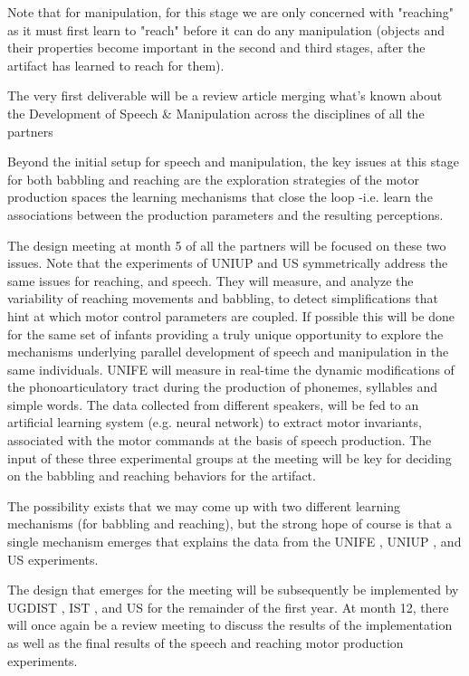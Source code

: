 Note that for manipulation, for this stage we are only concerned with
"reaching" as it must first learn to "reach" before it can do any
manipulation (objects and their properties become important in the
second and third stages, after the artifact has learned to reach for
them).

The very first deliverable will be a review article merging what's
known about the Development of Speech \& Manipulation across the
disciplines of all the partners

Beyond the initial setup for speech and manipulation, the key issues
at this stage for both babbling and reaching are the exploration
strategies of the motor production spaces the learning mechanisms that
close the loop -i.e. learn the associations between the production
parameters and the resulting perceptions.

The design meeting at month 5 of all the partners will be focused on
these two issues. Note that the experiments of UNIUP and US
symmetrically address the same issues for reaching, and speech. They
will measure, and analyze the variability of reaching movements and
babbling, to detect simplifications that hint at which motor control
parameters are coupled. If possible this will be done for the same set
of infants providing a truly unique opportunity to explore the
mechanisms underlying parallel development of speech and manipulation
in the same individuals. UNIFE will measure in real-time the dynamic
modifications of the phonoarticulatory tract during the production of
phonemes, syllables and simple words. The data collected from
different speakers, will be fed to an artificial learning system
(e.g. neural network) to extract motor invariants, associated with the
motor commands at the basis of speech production. The input of these
three experimental groups at the meeting will be key for deciding on
the babbling and reaching behaviors for the artifact.

The possibility exists that we may come up with two different learning
mechanisms (for babbling and reaching), but the strong hope of course
is that a single mechanism emerges that explains the data from the
UNIFE , UNIUP , and US experiments.

The design that emerges for the meeting will be subsequently be
implemented by UGDIST , IST , and US for the remainder of the first
year. At month 12, there will once again be a review meeting to
discuss the results of the implementation as well as the final results
of the speech and reaching motor production experiments.


